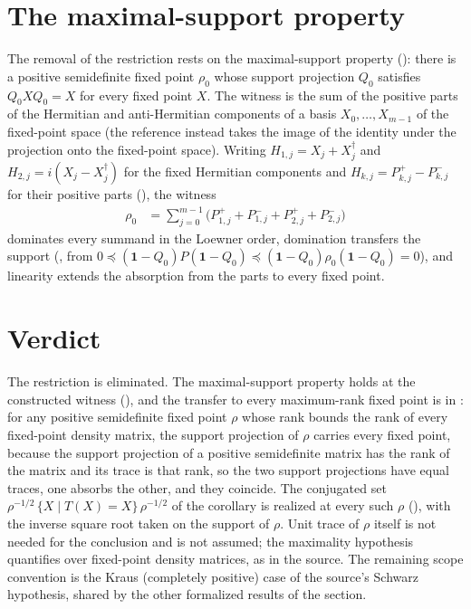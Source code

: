 \documentclass[11pt]{article}
\begin{document}
\section{The maximal-support property}

The removal of the restriction rests on the maximal-support property
(): there is a positive semidefinite
fixed point $\rho_0$ whose support projection $Q_0$ satisfies $Q_0 X Q_0 = X$ for every
fixed point $X$. The witness is the sum of the positive parts of the Hermitian and
anti-Hermitian components of a basis $X_0, \ldots, X_{m-1}$ of the fixed-point space
(the reference instead takes the image of the identity under the projection onto the
fixed-point space). Writing
$H_{1,j} = X_j + X_j^{\dagger}$ and $H_{2,j} = i(X_j - X_j^{\dagger})$ for the fixed
Hermitian components and $H_{k,j} = P^{+}_{k,j} - P^{-}_{k,j}$ for their positive parts
(), the witness
\begin{align*}
    \rho_0 &= \sum_{j=0}^{m-1}
        \bigl(P^{+}_{1,j} + P^{-}_{1,j} + P^{+}_{2,j} + P^{-}_{2,j}\bigr)
\end{align*}
dominates every summand in the Loewner order, domination transfers the support
(, from
$0 \preceq (\mathbf 1-Q_0)P(\mathbf 1-Q_0) \preceq (\mathbf 1-Q_0)\rho_0(\mathbf 1-Q_0) = 0$),
and linearity extends the absorption from the parts to every fixed point.

\section{Verdict}

The restriction is eliminated. The maximal-support property holds at the constructed
witness (), and the transfer to every
maximum-rank fixed point is
 in
: for any positive semidefinite fixed
point $\rho$ whose rank bounds the rank of every fixed-point density matrix, the support
projection of $\rho$ carries every fixed point, because the support projection of a
positive semidefinite matrix has the rank of the matrix and its trace is that rank, so
the two support projections have equal traces, one absorbs the other, and they coincide.
The conjugated set $\rho^{-1/2}\,\{X \mid T(X) = X\}\,\rho^{-1/2}$ of the corollary is
realized at every such $\rho$
(), with the inverse
square root taken on the support of $\rho$. Unit trace of $\rho$ itself is not needed for
the conclusion and is not assumed; the maximality hypothesis quantifies over fixed-point
density matrices, as in the source. The remaining scope convention is the Kraus
(completely positive) case of the source's Schwarz hypothesis, shared by the other
formalized results of the section.
\end{document}
